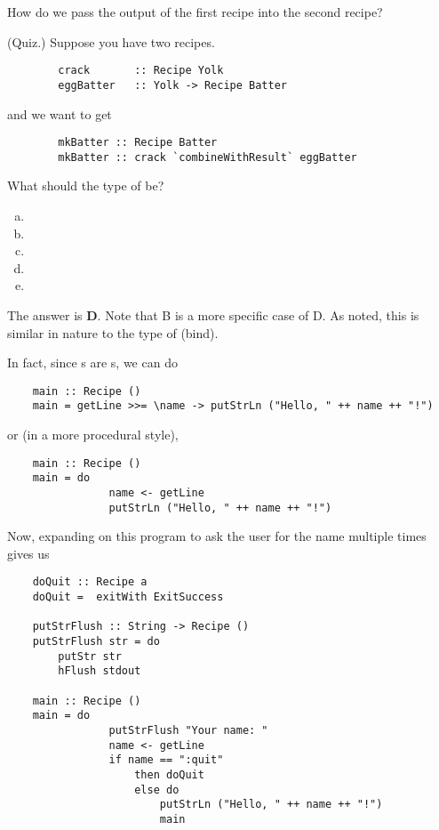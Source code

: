 \documentclass[letterpaper]{article}
\begin{document}
How do we pass the output of the first recipe into the second recipe? 
\begin{mdframed}[]
    (Quiz.) Suppose you have two recipes.
    \begin{verbatim}
        crack       :: Recipe Yolk 
        eggBatter   :: Yolk -> Recipe Batter  \end{verbatim}
    and we want to get 
    \begin{verbatim}
        mkBatter :: Recipe Batter 
        mkBatter :: crack `combineWithResult` eggBatter\end{verbatim}
    What should the type of  be? 

    \begin{enumerate}[(a)]
        \item {}
        \item {}
        \item {}
        \item {}
        \item {}
    \end{enumerate}

    \begin{mdframed}[]
        The answer is \textbf{D}. Note that B is a more specific case of D. As noted, this is similar in nature to the type of \code{>>=} (bind). 
    \end{mdframed}
\end{mdframed}
In fact, since s are s, we can do 
\begin{verbatim}
    main :: Recipe ()
    main = getLine >>= \name -> putStrLn ("Hello, " ++ name ++ "!")\end{verbatim}
or (in a more procedural style),
\begin{verbatim}
    main :: Recipe ()
    main = do 
                name <- getLine
                putStrLn ("Hello, " ++ name ++ "!")\end{verbatim}
Now, expanding on this program to ask the user for the name multiple times gives us 
\begin{verbatim}
    doQuit :: Recipe a 
    doQuit =  exitWith ExitSuccess

    putStrFlush :: String -> Recipe ()
    putStrFlush str = do 
        putStr str 
        hFlush stdout 

    main :: Recipe ()
    main = do 
                putStrFlush "Your name: "
                name <- getLine
                if name == ":quit"
                    then doQuit 
                    else do 
                        putStrLn ("Hello, " ++ name ++ "!")
                        main\end{verbatim}
\end{document}
